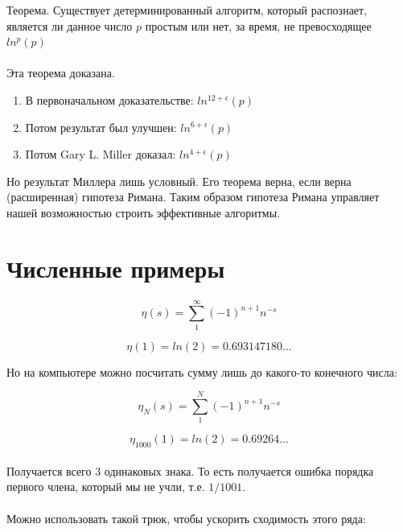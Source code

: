\documentclass{article}
\begin{document}
Теорема. Существует детерминированный алгоритм, который распознает,
является ли данное число $p$ простым или нет, за время, не превосходящее $ln^p(p)$

\paragraph{}
Эта теорема доказана.

\begin{enumerate}
    \item В первоначальном доказательстве: $ ln^{12 + \epsilon}(p) $
    \item Потом результат был улучшен: $ ln^{6 + \epsilon}(p) $
    \item Потом Gary L. Miller доказал: $ ln^{4 + \epsilon}(p) $
\end{enumerate}

Но результат Миллера лишь условный. Его теорема верна, если верна (расширенная)
гипотеза Римана. Таким образом гипотеза Римана управляет нашей возможностью строить
эффективные алгоритмы.

\section{Численные примеры}

\paragraph{}
\[ \eta (s) = \sum_{1}^{\infty} (-1)^{n+1} n^{-s} \]

$$ \eta(1) = ln(2) = 0.693147180... $$

Но на компьютере можно посчитать сумму лишь до какого-то конечного числа:

$$
    \eta_N (s) = \sum_{1}^{N} (-1)^{n+1} n^{-s}
$$

$$ \eta_{1000}(1) = ln(2) = 0.69264... $$

\paragraph{}
Получается всего 3 одинаковых знака. То есть получается ошибка порядка первого члена,
который мы не учли, т.е. $1/1001$.

\paragraph{}
Можно использовать такой трюк, чтобы ускорить сходимость этого ряда:
\end{document}
